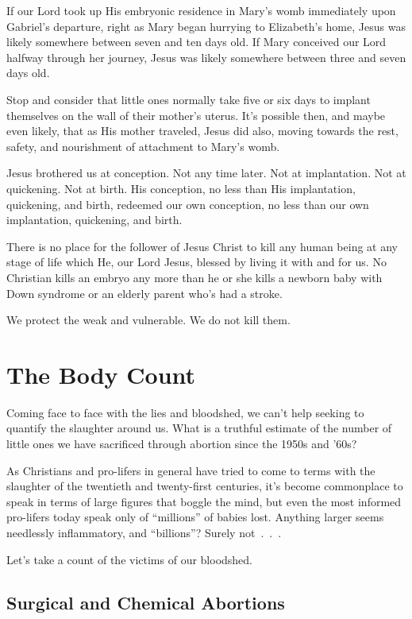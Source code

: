 \documentclass[
]{book}
\begin{document}
If our Lord took up His embryonic residence in Mary's womb immediately upon Gabriel's departure, right as Mary began hurrying to Elizabeth's home, Jesus was likely somewhere between seven and ten days old. If Mary conceived our Lord halfway through her journey, Jesus was likely somewhere between three and seven days old.

Stop and consider that little ones normally take five or six days to implant themselves on the wall of their mother's uterus. It's possible then, and maybe even likely, that as His mother traveled, Jesus did also, moving towards the rest, safety, and nourishment of attachment to Mary's womb.

Jesus brothered us at conception. Not any time later. Not at implantation. Not at quickening. Not at birth. His conception, no less than His implantation, quickening, and birth, redeemed our own conception, no less than our own implantation, quickening, and birth.

There is no place for the follower of Jesus Christ to kill any human being at any stage of life which He, our Lord Jesus, blessed by living it with and for us. No Christian kills an embryo any more than he or she kills a newborn baby with Down syndrome or an elderly parent who's had a stroke.

We protect the weak and vulnerable. We do not kill them.

\hypertarget{the-body-count}{%
\section{The Body Count}\label{the-body-count}}

Coming face to face with the lies and bloodshed, we can't help seeking to quantify the slaughter around us. What is a truthful estimate of the number of little ones we have sacrificed through abortion since the 1950s and '60s?

As Christians and pro-lifers in general have tried to come to terms with the slaughter of the twentieth and twenty-first centuries, it's become commonplace to speak in terms of large figures that boggle the mind, but even the most informed pro-lifers today speak only of ``millions'' of babies lost. Anything larger seems needlessly inflammatory, and ``billions''? Surely not~.~.~.

Let's take a count of the victims of our bloodshed.

\hypertarget{surgical-and-chemical-abortions}{%
\subsection{Surgical and Chemical Abortions}\label{surgical-and-chemical-abortions}}
\end{document}
